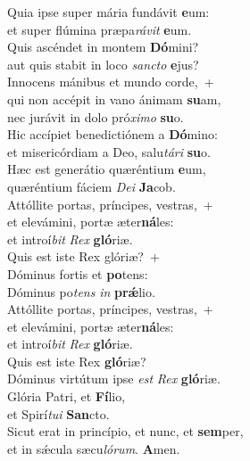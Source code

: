 \evenverse Quia ipse super mária fundávit \textbf{e}um:~\*\\
\evenverse et super flúmina præpa\textit{rá}\textit{vit} \textbf{e}um.\\
\oddverse Quis ascéndet in montem \textbf{Dó}mini?~\*\\
\oddverse aut quis stabit in loco \textit{san}\textit{cto} \textbf{e}jus?\\
\evenverse Innocens mánibus et mundo corde,~+\\
\evenverse  qui non accépit in vano ánimam \textbf{su}am,~\*\\
\evenverse nec jurávit in dolo pró\textit{xi}\textit{mo} \textbf{su}o.\\
\oddverse Hic accípiet benedictiónem a \textbf{Dó}mino:~\*\\
\oddverse et misericórdiam a Deo, salu\textit{tá}\textit{ri} \textbf{su}o.\\
\evenverse Hæc est generátio quæréntium \textbf{e}um,~\*\\
\evenverse quæréntium fáciem \textit{De}\textit{i} \textbf{Ja}cob.\\
\oddverse Attóllite portas, príncipes, vestras,~+\\
\oddverse  et elevámini, portæ æter\textbf{ná}les:~\*\\
\oddverse et introí\textit{bit} \textit{Rex} \textbf{gló}riæ.\\
\evenverse Quis est iste Rex glóriæ?~+\\
\evenverse  Dóminus fortis et \textbf{po}tens:~\*\\
\evenverse Dóminus po\textit{tens} \textit{in} \textbf{prǽ}lio.\\
\oddverse Attóllite portas, príncipes, vestras,~+\\
\oddverse  et elevámini, portæ æter\textbf{ná}les:~\*\\
\oddverse et introí\textit{bit} \textit{Rex} \textbf{gló}riæ.\\
\evenverse Quis est iste Rex \textbf{gló}riæ?~\*\\
\evenverse Dóminus virtútum ipse \textit{est} \textit{Rex} \textbf{gló}riæ.\\
\oddverse Glória Patri, et \textbf{Fí}lio,~\*\\
\oddverse et Spirí\textit{tu}\textit{i} \textbf{San}cto.\\
\evenverse Sicut erat in princípio, et nunc, et \textbf{sem}per,~\*\\
\evenverse et in sǽcula sæcu\textit{ló}\textit{rum}. \textbf{A}men.\\
